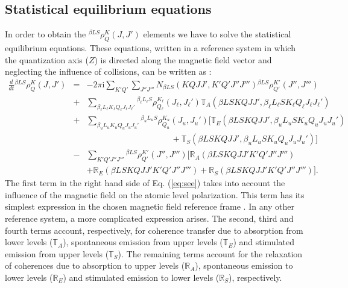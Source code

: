 \documentclass[12pt]{article}
\begin{document}
\subsection{Statistical equilibrium equations}
In order to obtain the
${^{\beta LS}\rho^K_Q(J,J')}$ elements we have to solve the  
statistical equilibrium equations. These equations, written in a reference
system in which 
the quantization axis ($Z$) 
is directed along the
magnetic field vector and
neglecting the 
influence of collisions, can be written as \citep{landi_landolfi04}:
\begin{eqnarray}
\frac{d}{dt} {^{\beta LS}\rho^K_Q(J,J')} &=& -2\pi \mathrm{i} \sum_{K' Q'}
\sum_{J'' J'''} N_{\beta LS}(KQJJ',K'Q'J''J''') {^{\beta LS}\rho^{K'}_{Q'}(J'',J''')}
\nonumber \\
&+& \sum_{\beta_\ell L_\ell K_\ell Q_\ell J_\ell J_\ell'} {^{\beta_\ell L_\ell
S}\rho^{K_\ell}_{Q_\ell}(J_\ell,J_\ell')} 
\mathbb{T}_A(\beta L S K Q J J', \beta_\ell L_\ell S K_\ell Q_\ell J_\ell
J_\ell') \nonumber \\
&+& \sum_{\beta_u L_u K_u Q_u J_u J_u'} {^{\beta_u L_u
S}\rho^{K_u}_{Q_u}(J_u,J_u')} 
\Big[ \mathbb{T}_E(\beta L S K Q J J', \beta_u L_u S K_u Q_u J_u J_u') \nonumber \\
& &\qquad \qquad \qquad \qquad \qquad + \mathbb{T}_S(\beta L S K Q
J J', \beta_u L_u S K_u Q_u J_u J_u') \Big] \nonumber \\
&-& \sum_{K' Q' J'' J'''} {^{\beta L S}\rho^{K'}_{Q'}(J'',J''') } \Big[
\mathbb{R}_A(\beta L S K Q J J' K' Q' J'' J''') \nonumber \\
& & + \mathbb{R}_E(\beta L S K Q J J' K'
Q' J'' J''') + \mathbb{R}_S(\beta L S K Q J J' K' Q' J'' J''') \Big].
\label{eq:see}
\end{eqnarray}
The first term in the right hand side of Eq. (\ref{eq:see}) takes into account
the 
influence of the magnetic field on the atomic level polarization. This term has 
its simplest expression in the chosen magnetic field
reference frame \citep[see eq. 7.41 of][]{landi_landolfi04}. 
In any other reference system, a more complicated expression
arises.
The second, third and fourth terms account, respectively, for coherence transfer due
to 
absorption from lower levels ($\mathbb{T}_A$), spontaneous emission from upper
levels 
($\mathbb{T}_E$) and stimulated emission from upper levels ($\mathbb{T}_S$).
The remaining terms account for the relaxation of coherences due to absorption to
upper 
levels ($\mathbb{R}_A$), spontaneous emission to lower levels ($\mathbb{R}_E$) 
and stimulated emission to lower levels ($\mathbb{R}_S$), respectively. 
\end{document}
